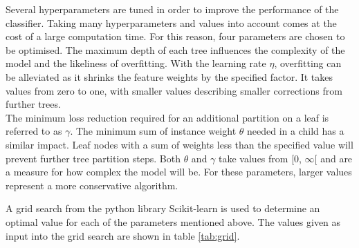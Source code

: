 Several hyperparameters are tuned in order to improve the performance of the classifier.
Taking many hyperparameters and values into account comes at the
cost of a large computation time. For this reason, four parameters are chosen to be optimised. The maximum depth of each tree influences the
complexity of the model and the likeliness of overfitting. With the learning rate $\eta$, overfitting can be alleviated as it shrinks the feature weights
by the specified factor. It takes values from zero to one, with smaller values describing smaller corrections from further trees. \\
The minimum loss reduction required for an additional partition on a leaf is referred to as $\gamma$. The minimum sum of instance weight $\theta$
needed in a child has a similar impact. Leaf nodes with a sum of weights less than the specified value will prevent further tree partition steps.
Both $\theta$ and $\gamma$ take values from [0, $\infty$[ and are a measure for how complex the model will be.
For these parameters, larger values represent a more
conservative algorithm.

A grid search from the python \cite{python} library Scikit-learn \cite{scikit} is used to determine an optimal value for each of the parameters mentioned above. The values given as input into the grid search
are shown in table \ref{tab:grid}.

